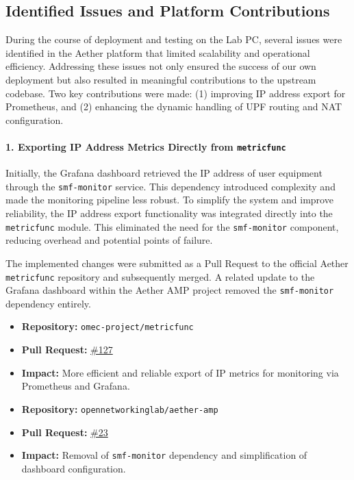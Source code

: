 \subsection{Identified Issues and Platform Contributions}
\label{subsubsec:issues-solutions}

During the course of deployment and testing on the Lab PC, several issues were identified in the Aether platform that limited scalability and operational efficiency. Addressing these issues not only ensured the success of our own deployment but also resulted in meaningful contributions to the upstream codebase. Two key contributions were made: (1) improving IP address export for Prometheus, and (2) enhancing the dynamic handling of UPF routing and NAT configuration.

\paragraph{1. Exporting IP Address Metrics Directly from \texttt{metricfunc}}  
Initially, the Grafana dashboard retrieved the IP address of user equipment through the \texttt{smf-monitor} service. This dependency introduced complexity and made the monitoring pipeline less robust. To simplify the system and improve reliability, the IP address export functionality was integrated directly into the \texttt{metricfunc} module. This eliminated the need for the \texttt{smf-monitor} component, reducing overhead and potential points of failure.

The implemented changes were submitted as a Pull Request to the official Aether \texttt{metricfunc} repository and subsequently merged. A related update to the Grafana dashboard within the Aether AMP project removed the \texttt{smf-monitor} dependency entirely.

\begin{itemize}
    \item \textbf{Repository:} \texttt{omec-project/metricfunc}
    \item \textbf{Pull Request:} \href{https://github.com/omec-project/metricfunc/pull/127}{\#127}
    \item \textbf{Impact:} More efficient and reliable export of IP metrics for monitoring via Prometheus and Grafana.
\end{itemize}

\begin{itemize}
    \item \textbf{Repository:} \texttt{opennetworkinglab/aether-amp}
    \item \textbf{Pull Request:} \href{https://github.com/opennetworkinglab/aether-amp/pull/23}{\#23}
    \item \textbf{Impact:} Removal of \texttt{smf-monitor} dependency and simplification of dashboard configuration.
\end{itemize}

